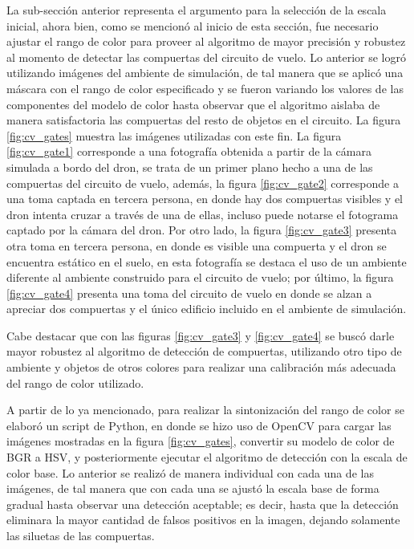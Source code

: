 La sub-sección anterior representa el argumento para la selección de la escala inicial, ahora bien, como se mencionó al inicio de esta sección, fue necesario ajustar el rango de color para proveer al algoritmo de mayor precisión y robustez al momento de detectar las compuertas del circuito de vuelo. Lo anterior se logró utilizando imágenes del ambiente de simulación, de tal manera que se aplicó una máscara con el rango de color especificado y se fueron variando los valores de las componentes del modelo de color hasta observar que el algoritmo aislaba de manera satisfactoria las compuertas del resto de objetos en el circuito. La figura \ref{fig:cv_gates} muestra las imágenes utilizadas con este fin. La figura \ref{fig:cv_gate1} corresponde a una fotografía obtenida a partir de la cámara simulada a bordo del dron, se trata de un primer plano hecho a una de las compuertas del circuito de vuelo, además, la figura \ref{fig:cv_gate2} corresponde a una toma captada en tercera persona, en donde hay dos compuertas visibles y el dron intenta cruzar a través de una de ellas, incluso puede notarse el fotograma captado por la cámara del dron. Por otro lado, la figura \ref{fig:cv_gate3} presenta otra toma en tercera persona, en donde es visible una compuerta y el dron se encuentra estático en el suelo, en esta fotografía se destaca el uso de un ambiente diferente al ambiente construido para el circuito de vuelo; por último, la figura \ref{fig:cv_gate4} presenta una toma del circuito de vuelo en donde se alzan a apreciar dos compuertas y el único edificio incluido en el ambiente de simulación. 

Cabe destacar que  con las figuras \ref{fig:cv_gate3} y \ref{fig:cv_gate4} se buscó darle mayor robustez al algoritmo de detección de compuertas, utilizando otro tipo de ambiente y objetos de otros colores para realizar una calibración más adecuada del rango de color utilizado.

A partir de lo ya mencionado, para realizar la sintonización del rango de color se elaboró un script de Python, en donde se hizo uso de OpenCV para cargar las imágenes mostradas en la figura \ref{fig:cv_gates}, convertir su modelo de color de BGR a HSV, y posteriormente ejecutar el algoritmo de detección con la escala de color base. Lo anterior se realizó de manera individual con cada una de las imágenes, de tal manera que con cada una se ajustó la escala base de forma gradual hasta observar una detección aceptable; es decir, hasta que la detección eliminara la mayor cantidad de falsos positivos en la imagen, dejando solamente las siluetas de las compuertas. 

